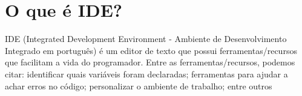\section{O que é IDE?}

IDE (Integrated Development Environment - Ambiente de Desenvolvimento Integrado em português) é um editor de texto que possui ferramentas/recursos que facilitam a vida do programador. Entre as ferramentas/recursos, podemos citar: identificar quais variáveis foram declaradas; ferramentas para ajudar a achar erros no código; personalizar o ambiente de trabalho; entre outros
